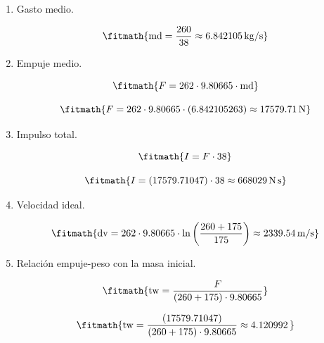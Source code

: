 \begin{enumerate}

\item Gasto medio.

\[\fitmath{\mathrm{md}=\frac{260}{38}\approx 6.842105\,\mathrm{kg/s}}\]

\item Empuje medio.

\[\fitmath{F=262\cdot 9.80665\cdot \mathrm{md}}\]

\[\fitmath{F=262\cdot 9.80665\cdot (6.842105263)\approx 17579.71\,\mathrm{N}}\]

\item Impulso total.

\[\fitmath{I=F\cdot 38}\]

\[\fitmath{I=(17579.71047)\cdot 38\approx 668029\,\mathrm{N\,s}}\]

\item Velocidad ideal.

\[\fitmath{\mathrm{dv}=262\cdot 9.80665\cdot \ln\left(\frac{260+175}{175}\right)\approx 2339.54\,\mathrm{m/s}}\]

\item Relación empuje-peso con la masa inicial.

\[\fitmath{\mathrm{tw}=\frac{F}{\left(260+175\right)\cdot 9.80665}}\]

\[\fitmath{\mathrm{tw}=\frac{(17579.71047)}{\left(260+175\right)\cdot 9.80665}\approx 4.120992\,}\]

\end{enumerate}
